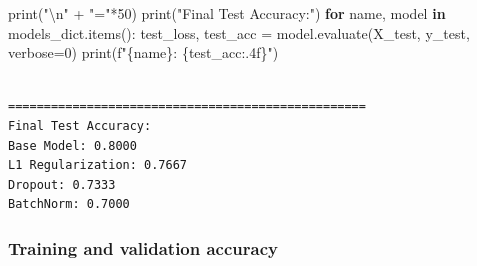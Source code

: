 \documentclass[
]{IEEEtran}
\newenvironment{Shaded}{\begin{snugshade}}{\end{snugshade}}
\newcommand{\BuiltInTok}[1]{\textcolor[rgb]{0.00,0.23,0.31}{#1}}
\newcommand{\CharTok}[1]{\textcolor[rgb]{0.13,0.47,0.30}{#1}}
\newcommand{\ControlFlowTok}[1]{\textcolor[rgb]{0.00,0.23,0.31}{\textbf{#1}}}
\newcommand{\DecValTok}[1]{\textcolor[rgb]{0.68,0.00,0.00}{#1}}
\newcommand{\KeywordTok}[1]{\textcolor[rgb]{0.00,0.23,0.31}{\textbf{#1}}}
\newcommand{\NormalTok}[1]{\textcolor[rgb]{0.00,0.23,0.31}{#1}}
\newcommand{\OperatorTok}[1]{\textcolor[rgb]{0.37,0.37,0.37}{#1}}
\newcommand{\SpecialCharTok}[1]{\textcolor[rgb]{0.37,0.37,0.37}{#1}}
\newcommand{\SpecialStringTok}[1]{\textcolor[rgb]{0.13,0.47,0.30}{#1}}
\newcommand{\StringTok}[1]{\textcolor[rgb]{0.13,0.47,0.30}{#1}}
\begin{document}
\begin{Shaded}
\begin{Highlighting}[]
\BuiltInTok{print}\NormalTok{(}\StringTok{"}\CharTok{\textbackslash{}n}\StringTok{"} \OperatorTok{+} \StringTok{"="}\OperatorTok{*}\DecValTok{50}\NormalTok{)}
\BuiltInTok{print}\NormalTok{(}\StringTok{"Final Test Accuracy:"}\NormalTok{)}
\ControlFlowTok{for}\NormalTok{ name, model }\KeywordTok{in}\NormalTok{ models\_dict.items():}
\NormalTok{    test\_loss, test\_acc }\OperatorTok{=}\NormalTok{ model.evaluate(X\_test, y\_test, verbose}\OperatorTok{=}\DecValTok{0}\NormalTok{)}
    \BuiltInTok{print}\NormalTok{(}\SpecialStringTok{f"}\SpecialCharTok{\{}\NormalTok{name}\SpecialCharTok{\}}\SpecialStringTok{: }\SpecialCharTok{\{}\NormalTok{test\_acc}\SpecialCharTok{:.4f\}}\SpecialStringTok{"}\NormalTok{)}
\end{Highlighting}
\end{Shaded}

\begin{verbatim}

==================================================
Final Test Accuracy:
Base Model: 0.8000
L1 Regularization: 0.7667
Dropout: 0.7333
BatchNorm: 0.7000
\end{verbatim}

\subsubsection{Training and validation
accuracy}\label{training-and-validation-accuracy}

\texttt{}
\end{document}
